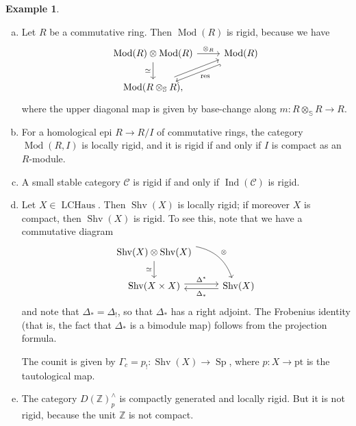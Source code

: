 \documentclass[draft]{amsart}
\newcommand{\ZZ}{\mathbb{Z}}
\renewcommand{\SS}{\mathbb{S}}
\newcommand{\cat}[1]{\mathcal{#1}}
\DeclareMathOperator{\LCHaus}{LCHaus}
\DeclareMathOperator{\Ind}{Ind}
\DeclareMathOperator{\Shv}{Shv}
\DeclareMathOperator{\Sp}{Sp}
\DeclareMathOperator{\Mod}{Mod}
\theoremstyle{definition}
\newtheorem{ex}[thm]{Example}
\begin{document}
\begin{ex}
\begin{enumerate}[(a)]
\item Let $R$ be a commutative ring. Then $\Mod(R)$ is rigid, because we have
\[
\begin{tikzcd}
\Mod(R) \otimes \Mod(R) \ar[r,"\otimes_R"] \ar[d,"\simeq"'] & \Mod(R) \ar[dl,shift left, hook, "\mathrm{res}"] \\
\Mod(R\otimes_{\SS}R ) \ar[ur,shift left],
\end{tikzcd}
\]
where the upper diagonal map is given by base-change along $m\colon R\otimes_{\SS} R \to R$. 

\item For a homological epi $R\to R/I$ of commutative rings, the category $\Mod(R,I)$ is locally rigid, and it is rigid if and only if $I$ is compact as an $R$-module.

\item A small stable category $\cat C$ is rigid if and only if $\Ind(\cat C)$ is rigid.

\item Let $X \in \LCHaus$. Then $\Shv(X)$ is locally rigid; if moreover $X$ is compact, then $\Shv(X)$ is rigid. To see this, note that we have a commutative diagram
\[
\begin{tikzcd}
\Shv(X) \otimes \Shv(X) \ar[dr,bend left, "\otimes"] \ar[d,"\simeq"'] \\
\Shv(X\times X)\ar[r,shift left,"\Delta^*"] & \ar[l,shift left,"\Delta_*"] \Shv(X)
\end{tikzcd}
\]
and note that $\Delta_* = \Delta_!$, so that $\Delta_*$ has a right adjoint. The Frobenius identity (that is, the fact that $\Delta_*$ is a bimodule map) follows from the projection formula.

The counit is given by $\Gamma_c = p_!\colon \Shv(X) \to \Sp$, where $p\colon X\to \mathrm{pt}$ is the tautological map.

\item The category $D(\ZZ)^\wedge_p$ is compactly generated and locally rigid. But it is not rigid, because the unit $\ZZ$ is not compact.
\end{enumerate}
\end{ex}
\end{document}
